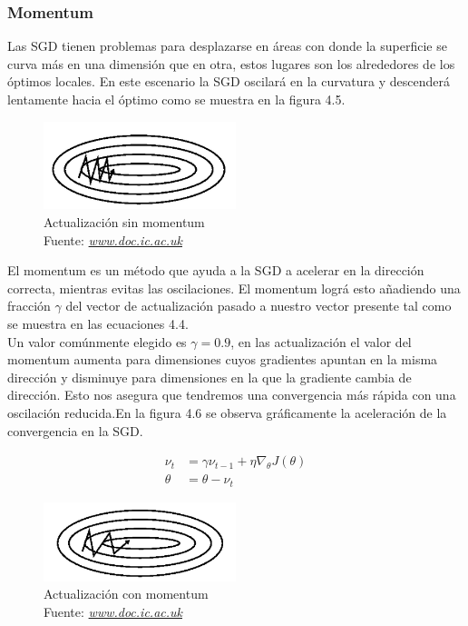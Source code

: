 \subsubsection{Momentum}
Las SGD tienen problemas para desplazarse en áreas con donde la superficie se curva más en una dimensión que en otra, estos lugares son los alrededores de los óptimos locales. En este escenario la SGD oscilará en la curvatura y descenderá lentamente hacia el óptimo como se muestra en la figura 4.5.
\begin{figure}[H]
	\centering
	\includegraphics[width=0.5\textwidth]{Figures/momentum1.png}
	\caption{Actualización sin momentum \\ Fuente:  \href{https://www.doc.ic.ac.uk/~js4416/163/website/neural-networks/optimisers.html}{\textit{www.doc.ic.ac.uk}}}
	\label{momentum1}
\end{figure}
El momentum es un método que ayuda a la SGD a acelerar en la dirección correcta, mientras evitas las oscilaciones. El momentum lográ esto añadiendo una fracción $\gamma$ del vector de actualización pasado a nuestro vector presente tal como se muestra en las ecuaciones 4.4.\\ Un valor comúnmente elegido es $\gamma =0.9 $, en las actualización el valor del momentum aumenta para dimensiones cuyos gradientes apuntan en la misma dirección y disminuye para dimensiones en la que la gradiente cambia de dirección. Esto nos asegura que tendremos una convergencia más rápida con una oscilación reducida.En la figura 4.6 se observa gráficamente la aceleración de la convergencia en la SGD.

\begin{equation}
\label{mbgds}
\begin{aligned}
\nu_{t}&=\gamma \nu_{t-1} +  \eta \nabla_{\theta} J(\theta)\\
\theta &= \theta -\nu_{t}
\end{aligned}
\end{equation}

\begin{figure}[H]
	\centering
	\includegraphics[width=0.5\textwidth]{Figures/momentum2.png}
	\caption{Actualización con momentum \\ Fuente:  \href{https://www.doc.ic.ac.uk/~js4416/163/website/neural-networks/optimisers.html}{\textit{www.doc.ic.ac.uk}}}
	\label{momentum2 }
\end{figure}

